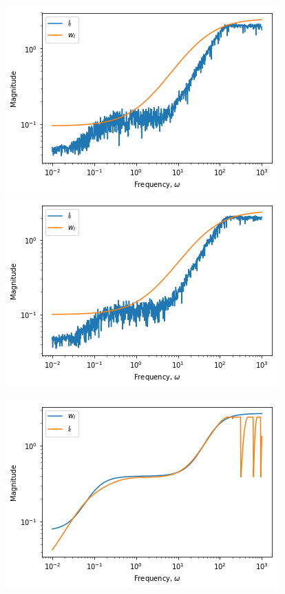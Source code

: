 \begin{figure}[H]
	\centering
	\begin{minipage}{.48\textwidth}
		\centering
		\includegraphics[width=\linewidth]{Figures/Uncertainty_wI_31}
	\end{minipage}%
	\hfill
	\begin{minipage}{.48\textwidth}
		\centering
		\includegraphics[width=\linewidth]{Figures/Uncertainty_wI_32}
	\end{minipage}
\end{figure}

\begin{figure}[H]
	\centering
	\includegraphics[width=.8\linewidth]{Figures/Uncertainty_wI_33}
\end{figure}